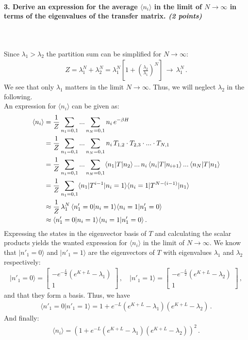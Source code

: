 \paragraph{3. Derive an expression for the 
    average $\langle n_i\rangle$ in the limit 
    of $N\to\infty$ in terms of the 
    eigenvalues of the transfer matrix.
    \textit{(2 points)}
} \ \\
\\
Since $\lambda_1>\lambda_2$ the partition sum can be simplified for $N\to\infty$:
\begin{align}
	Z = \lambda_1^N + \lambda_2^N
	= \lambda_1^N \left[1+\left(\frac{\lambda_2}{\lambda_1}\right)^N\right] \,
	\longrightarrow \, \lambda_1^N \,.
\end{align}
We see that only $\lambda_1$ matters in the limit $N\to\infty$. Thus, we will 
neglect $\lambda_2$ in the following. \\
An expression for $\langle n_i\rangle$ can be given as:
\begin{align}
	\langle n_i\rangle &= \frac{1}{Z} \sum_{n_1=0,1}...\sum_{n_N=0,1}
	n_i \, e^{-\beta H} \notag \\
	&= \frac{1}{Z} \sum_{n_1=0,1} ... \sum_{n_N=0,1} n_i \,
	T_{1,2} \cdot T_{2,3} \cdot ... \cdot T_{N,1} \notag \\
	&= \frac{1}{Z} \sum_{n_1=0,1} ... \sum_{n_N=0,1}
	\langle n_1 \vert T \vert n_2 \rangle \,
	... \, n_i \, \langle n_i \vert T \vert n_{i+1} \rangle \, ... \,
	\langle n_N \vert T \vert n_1 \rangle \notag \\
	&= \frac{1}{Z} \sum_{n_1=0,1}
	\langle n_1 \vert T^{i-1} \vert n_i=1 \rangle
	\langle n_i=1 \vert T^{N-(i-1)} \vert n_1 \rangle \notag \\
	&\approx \frac{1}{Z} \, \lambda_1^N \,
	\langle n'_1=0 \vert n_i=1 \rangle
	\langle n_i=1 \vert n'_1=0 \rangle \notag \\
	&\approx \langle n'_1=0 \vert n_i=1 \rangle
	\langle n_i=1 \vert n'_1=0 \rangle \,.
\end{align}
Expressing the states in the eigenvector basis of $T$ and calculating 
the scalar products yields the wanted expression for $\langle n_i\rangle$ 
in the limit of $N\to\infty$. We know that $\vert n'_1=0 \rangle$ and 
$\vert n'_1=1 \rangle$ are the eigenvectors of $T$ with eigenvalues 
$\lambda_1$ and $\lambda_2$ respectively:
\begin{align}
	\vert n'_1=0 \rangle = 
	\begin{bmatrix}
    -e^{-\frac{L}{2}}\left(e^{K+L}-\lambda_1\right) \\
    1
    \end{bmatrix} \,, \quad
    \vert n'_1=1 \rangle = 
	\begin{bmatrix}
    -e^{-\frac{L}{2}}\left(e^{K+L}-\lambda_2\right) \\
    1
    \end{bmatrix} \,,
\end{align}
and that they form a basis. Thus, we have
\begin{align}
	\langle n'_1=0 \vert n'_1=1 \rangle =
	1 + e^{-L}(e^{K+L}-\lambda_1)(e^{K+L}-\lambda_2) \,.
\end{align}
And finally:
\begin{align}
	\langle n_i\rangle = 
	\left( 1 + e^{-L}(e^{K+L}-\lambda_1)(e^{K+L}-\lambda_2) \right)^2 \,.
\end{align}